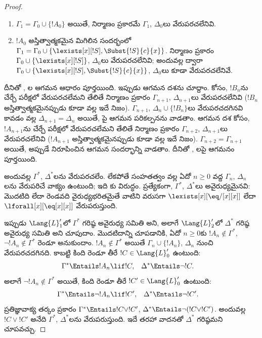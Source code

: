 \documentclass[../../../include/open-logic-section]{subfiles}
\begin{document}
\begin{proof}
\begin{enumerate}
  $\Gamma_1 = \Gamma_0$; అప్పుడు  కేవలం
  నే అవుతుంది;
\item $\Gamma_1 = \Gamma_0 \cup\{ !A_0\}$ అయితే, నిర్మాణం ప్రకారమే
  $\Gamma_1$, $\Delta_0$లు వేరుపరచలేనివి.
\item $!A_0$ అస్తిత్వాత్మకమైన మిగిలిన సందర్భంలో
  $\Gamma_1 = \Gamma_0 \cup \{ \lexists[x][!S],
  \Subst{!S}{c}{x} \}$. నిర్మాణం ప్రకారం
  $\Gamma_0 \cup \{ \lexists[x][!S]\}$, $\Delta_0$లు
  వేరుపరచలేనివి; అందువల్ల  ద్వారా
  $\Gamma_0 \cup \{ \lexists[x][!S], \Subst{!S}{c}{x} \}$,
  $\Delta_0$లు కూడా వేరుపరచలేనివే.
\end{enumerate}
దీనితో , ల ఆగమన ఆధారం పూర్తయింది.
ఇప్పుడు ఆగమన దశను చూద్దాం.  కోసం,
$!B_n$ను చేర్చే పరీక్షలో వేరుపరచలేమని తేలితే నిర్మాణం ప్రకారం
$\Gamma_{n+1}$, $\Delta_{n+1}$లు వేరుపరచలేనివి ($!B_n$
అస్తిత్వాత్మకమైనప్పుడు కూడా  వల్ల ఇదే నిజం).
$\Gamma_{n+1}$, $\Delta_n \cup \{!B_n\}$లు వేరుపరచదగినవి కావడం వల్ల
$\Delta_{n+1} = \Delta_n$ అయితే, పై ఆగమన పరికల్పనను
వాడతాం.  ఆగమన దశ కోసం,
$!A_{n+1}$ను చేర్చే పరీక్షలో వేరుపరచలేమని తేలితే నిర్మాణం
ప్రకారం $\Gamma_{n+2}$, $\Delta_{n+1}$లు వేరుపరచలేనివి
($!A_{n+1}$ అస్తిత్వాత్మకమైనప్పుడు కూడా  వల్ల
ఇదే నిజం). $\Gamma_{n+2} = \Gamma_{n+1}$ అయితే, అప్పుడే నిరూపించిన
 ఆగమన సందర్భాన్ని వాడతాం. దీనితో ,
లపై ఆగమనం పూర్తయింది.

అందువల్ల $\Gamma^*$, $\Delta^*$లను వేరుపరచలేం. లేకపోతే
సంహతత్వం వల్ల ఏదో $n \ge 0$ వద్ద $\Gamma_n$, $\Delta_n$లను
వేరుపరిచే వాక్యం ఉంటుంది; ఇది కు విరుద్ధం. ప్రత్యేకంగా,
$\Gamma^*$, $\Delta^*$లు అవైరుధ్యమైనవి: మొదటిది లేదా రెండవది
వైరుధ్యభరితమైతే వాటిని వరుసగా $\lexists[x][\eq/[x][x]]$ లేదా
$\lforall[x][\eq[x][x]]$ వేరుపరుస్తుంది.

ఇప్పుడు $\Lang{L}'_1$లో $\Gamma^*$ గరిష్ఠ అవైరుధ్య సమితి అని,
అలాగే $\Lang{L}'_2$లో $\Delta^*$ గరిష్ఠ అవైరుధ్య సమితి అని చూపుదాం.
మొదటిదాన్ని చూపడానికి, ఏదో $n \ge 0$కు $!A_n \notin \Gamma^*$,
$\lnot !A_n \notin \Gamma^*$ రెండూ అనుకుందాం. $!A_n \notin
\Gamma^*$ అయితే $\Gamma_n \cup \{!A_n \}$, $\Delta_n$ నుంచి
వేరుపరచదగినది. కాబట్టి కింది రెండూ తీరే $!C \in \Lang{L}'_0$
ఉంటుంది:
\begin{align*}
  \Gamma^* & \Entails !A_n \lif !C, &
  \Delta^* & \Entails \lnot !C.
\end{align*}
అలాగే $\lnot !A_n \notin \Gamma^*$ అయితే, కింది రెండూ తీరే
$!C' \in \Lang{L}'_0$ ఉంటుంది:
\begin{align*}
  \Gamma^* & \Entails \lnot !A_n \lif !C', &
  \Delta^* & \Entails \lnot !C'.
\end{align*}
ప్రతిజ్ఞావాక్య తర్కం ప్రకారం $\Gamma^* \Entails !C \lor !C'$,
$\Delta^* \Entails \lnot (!C \lor !C')$. అందువల్ల $!C \lor !C'$ అనేది
$\Gamma^*$, $\Delta^*$లను వేరుపరుస్తుంది. ఇదే తరహా వాదనతో $\Delta^*$
గరిష్ఠమని చూపవచ్చు.


\end{proof}
\end{document}
